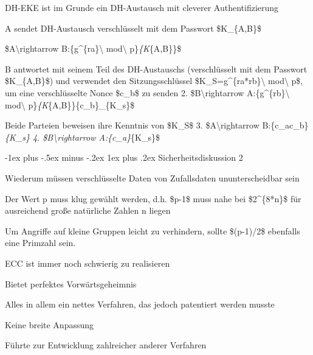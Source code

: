 \documentclass[a4paper]{article}
\makeatletter
\renewcommand{\subsubsection}{\@startsection{subsubsection}{3}{0mm}%
 {-1ex plus -.5ex minus -.2ex}%
 {1ex plus .2ex}%
 {\normalfont\small\bfseries}}
\makeatother
\begin{document}
\begin{multicols}{3}
      \begin{itemize*}
            \item DH-EKE ist im Grunde ein DH-Austausch mit cleverer Authentifizierung
            \item A sendet DH-Austausch verschlüsselt mit dem Passwort \$K\_\{A,B\}\$
            \begin{enumerate*}
                  \def\labelenumi{\arabic{enumi}.}
                  \item \$A\textbackslash rightarrow B:\{g\^{}\{ra\}\textbackslash{} mod\textbackslash{} p\}\emph{\{K}\{A,B\}\}\$
            \end{enumerate*}
            \item B antwortet mit seinem Teil des DH-Austauschs (verschlüsselt mit dem
            Passwort \$K\_\{A,B\}\$) und verwendet den Sitzungsschlüssel
            \$K\_S=g\^{}\{ra*rb\}\textbackslash{} mod\textbackslash{} p\$, um eine
            verschlüsselte Nonce \$c\_b\$ zu senden 2.
            \$B\textbackslash rightarrow A:\{g\^{}\{rb\}\textbackslash{}
            mod\textbackslash{} p\}\emph{\{K}\{A,B\}\}\{c\_b\}\_\{K\_s\}\$
            \item Beide Parteien beweisen ihre Kenntnis von \$K\_S\$ 3.
            \$A\textbackslash rightarrow
            B:\{c\_a\textbar\textbar c\_b\}\emph{\{K\_s\} 4.
                  \$B\textbackslash rightarrow A:\{c\_a\}}\{K\_s\}\$
      \end{itemize*}


      \subsubsection{Sicherheitsdiskussion 2}

      \begin{itemize*}
            \item Wiederum müssen verschlüsselte Daten von Zufallsdaten ununterscheidbar
            sein
            \begin{itemize*}
                  \item Der Wert p muss klug gewählt werden, d.h. \$p-1\$ muss nahe bei \$2\^{}\{8*n\}\$ für ausreichend große natürliche Zahlen n liegen
                  \item Um Angriffe auf kleine Gruppen leicht zu verhindern, sollte \$(p-1)/2\$ ebenfalls eine Primzahl sein.
                  \item ECC ist immer noch schwierig zu realisieren
            \end{itemize*}
            \item Bietet perfektes Vorwärtsgeheimnis
            \item Alles in allem ein nettes Verfahren, das jedoch patentiert werden
            musste
            \begin{itemize*}
                  \item Keine breite Anpassung
                  \item Führte zur Entwicklung zahlreicher anderer Verfahren
            \end{itemize*}
      \end{itemize*}



\end{multicols}
\end{document}
